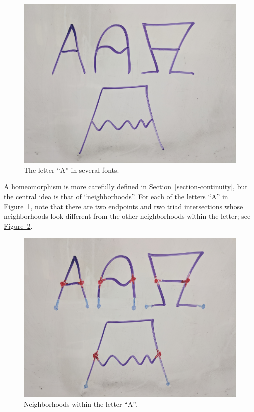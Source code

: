\documentclass[10pt,]{article}
\begin{document}
\begin{figure}
\centering
\includegraphics[width=1\linewidth]{images/letter-a.jpg}
\caption{The letter ``A'' in several fonts.\label{figure-letter-a}}
\end{figure}
\hypertarget{p-13}{}%
A homeomorphism is more carefully defined in \hyperref[section-continuity]{Section~\ref{section-continuity}}, but the central idea is that of ``neighborhoods''. For each of the letters ``A'' in \hyperref[figure-letter-a]{Figure~\ref{figure-letter-a}}, note that there are two endpoints and two triad intersections whose neighborhoods look different from the other neighborhoods within the letter; see \hyperref[figure-letter-a-neighborhoods]{Figure~\ref{figure-letter-a-neighborhoods}}.%
\begin{figure}
\centering
\includegraphics[width=1\linewidth]{images/letter-a-neighborhoods.jpg}
\caption{Neighborhoods within the letter ``A''.\label{figure-letter-a-neighborhoods}}
\end{figure}
\end{document}
